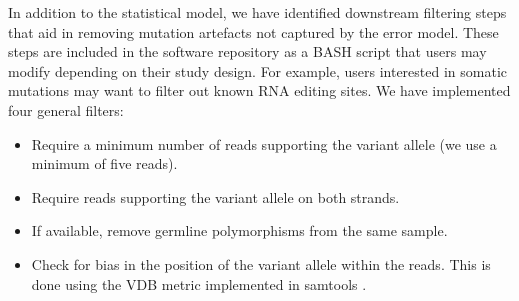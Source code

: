 In addition to the statistical model, we have identified downstream filtering steps that aid in removing mutation artefacts not captured by the error model. These steps are included in the software repository as a BASH script that users may modify depending on their study design. For example, users interested in somatic mutations may want to filter out known RNA editing sites. We have implemented four general filters:
\begin{itemize}
   \item Require a minimum number of reads supporting the variant allele (we use a minimum of five reads).
   \item Require reads supporting the variant allele on both strands.
   \item If available, remove germline polymorphisms from the same sample.
   \item Check for bias in the position of the variant allele within the reads. This is done using the VDB metric implemented in samtools \cite{li2009b}.
\end{itemize}

